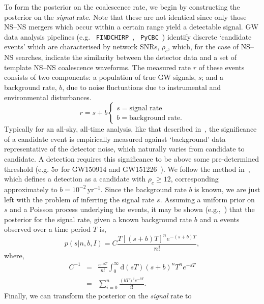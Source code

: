 \documentclass[twocolumn]{aastex61}
\newcommand{\diff}{{\mathrm d}}
\newcommand{\BNS}{\ac{NS}--\ac{NS}\xspace}
\begin{document}
To form the posterior on the coalescence rate, we begin by constructing the
posterior on the \emph{signal} rate.  Note that these are not identical since
only those \BNS mergers which occur within a certain range yield a detectable
signal.  \ac{GW} data analysis pipelines (e.g. {\tt
FINDCHIRP}~\cite{2012PhRvD..85l2006A}, {\tt
PyCBC}~\cite{Canton:2014ena,Usman:2015kfa,alex_nitz_2017_844934}) identify
discrete `candidate events' which are characterised by network \acp{SNR},
$\rho_c$, which, for the case of \BNS searches, indicate the similarity between
the detector data and a set of template \BNS coalescence waveforms.  The
measured rate $r$ of these events consists of two components: a population of
true \ac{GW} signals, $s$; and a background rate, $b$, due to noise fluctuations
due to instrumental and environmental disturbances.
%
\begin{equation}
r = s + b
\begin{cases}
s = \text{signal rate} \\
b = \text{background rate}.
\end{cases}
\end{equation}
%
Typically for an all-sky, all-time analysis, like that described
in~\cite{Usman:2015kfa}, the significance of a candidate event is
empirically measured against `background' data representative of the
detector noise, which naturally varies from candidate to candidate.  A
detection requires this significance to be above some pre-determined
threshold (e.g. $5\sigma$ for GW150914 and
GW151226~\cite{Abbott:2016blz,Abbott:2016nmj}).  We follow the method
in~\cite{Aasi:2013wya}, which defines a detection as a candidate with
$\rho_c \geq 12$, corresponding approximately to
$b=10^{-2}$\,yr$^{-1}$.  Since the background rate $b$ is known, we
are just left with the problem of inferring the signal rate $s$.
Assuming a uniform prior on $s$ and a Poisson process underlying the
events, it may be shown (e.g.,~\cite{2010blda.book.....G}) that the
posterior for the signal rate, given a known background rate $b$ and
$n$ events observed over a time period $T$ is,
%
\begin{equation}
p(s|n,b,I) = C \frac{ T\left[(s+b)T\right]^n e^{-(s+b)T}}{n!},
\end{equation}
%
where,
\begin{eqnarray}
C^{-1} & = &\frac{e^{-bT}}{n!} \int_0^{\infty}\diff(sT)(s+b)^n T^n e^{-sT}\\
& = & \sum_{i=0}^n \frac{ (bT)^i e^{-bT}}{i!}.
\end{eqnarray}
%
Finally, we can transform the posterior on the \emph{signal} rate to
\end{document}
